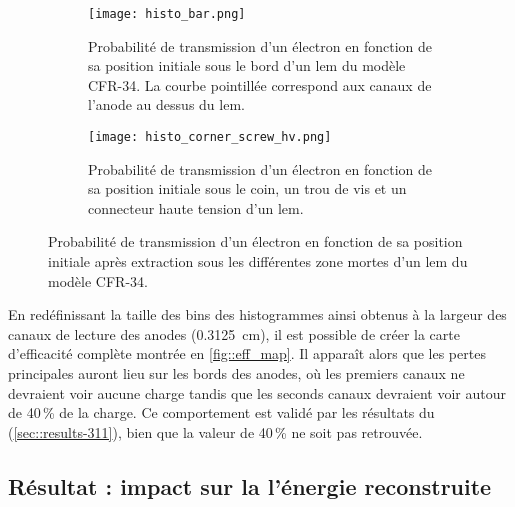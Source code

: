       \begin{figure}[!htb]
        \begin{subfigure}[t]{0.48\textwidth}
          \centering
          \texttt{[image: histo\_bar.png]}
          \caption{Probabilité de transmission d'un électron en fonction de sa position initiale sous le bord d'un \gls{lem} du modèle CFR-34. La courbe pointillée correspond aux canaux de l'anode au dessus du \gls{lem}.}
        \end{subfigure}
        \hfill
        \begin{subfigure}[t]{0.48\textwidth}
          \centering
          \texttt{[image: histo\_corner\_screw\_hv.png]}
          \caption{Probabilité de transmission d'un électron en fonction de sa position initiale sous le coin, un trou de vis et un connecteur haute tension d'un \gls{lem}.}
        \end{subfigure}
        \caption[Probabilité de transmission des zones mortes d'un LEM]{\label{fig::histo_eff}Probabilité de transmission d'un électron en fonction de sa position initiale après extraction sous les différentes zone mortes d'un \gls{lem} du modèle CFR-34.}
      \end{figure}
            
      En redéfinissant la taille des bins des histogrammes ainsi obtenus à la largeur des canaux de lecture des anodes (\SI{0.3125}{\centi\meter}), il est possible de créer la carte d'efficacité complète montrée en \autoref{fig::eff_map}. Il apparaît alors que les pertes principales auront lieu sur les bords des anodes, où les premiers canaux ne devraient voir aucune charge tandis que les seconds canaux devraient voir autour de 40\,\% de la charge. Ce comportement est validé par les résultats du \TOO{} (\autoref{sec::results-311}), bien que la valeur de 40\,\% ne soit pas retrouvée.
            
%            
            
    \subsection{Résultat : impact sur la l'énergie reconstruite}
            

